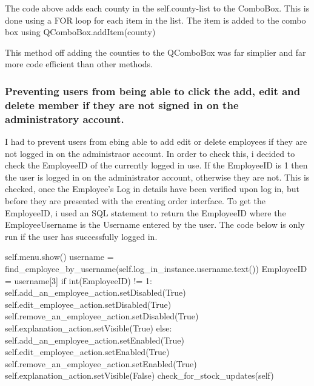 The code above adds each county in the self.county-list to the ComboBox. This is done using a FOR loop for each item in the list. The item is added to the combo box using QComboBox.addItem(county)

This method off adding the counties to the QComboBox was far simplier and far more code efficient than other methods.

\pagebreak

\subsubsection{Preventing users from being able to click the add, edit and delete member if they are not signed in on the administratory account.}

I had to prevent users from ebing able to add edit or delete employees if they are not logged in on the administraor account. In order to check this, i decided to check the EmployeeID of the currently logged in use. If the EmployeeID is 1 then the user is logged in on the administrator account, otherwise they are not. This is checked, once the Employee's Log in details have been verified upon log in, but before they are presented with the creating order interface. To get the EmployeeID, i used an SQL statement to return the EmployeeID where the EmployeeUsername is the Username entered by the user. The code below is only run if the user has successfully logged in.

\begin{python}
self.menu.show()
username = find_employee_by_username(self.log_in_instance.username.text())
EmployeeID = username[3]
if int(EmployeeID) != 1:
	self.add_an_employee_action.setDisabled(True)
	self.edit_employee_action.setDisabled(True)
	self.remove_an_employee_action.setDisabled(True)
	self.explanation_action.setVisible(True)
else:
	self.add_an_employee_action.setEnabled(True)
	self.edit_employee_action.setEnabled(True)
	self.remove_an_employee_action.setEnabled(True)
	self.explanation_action.setVisible(False)
	check_for_stock_updates(self)

\end{python}


